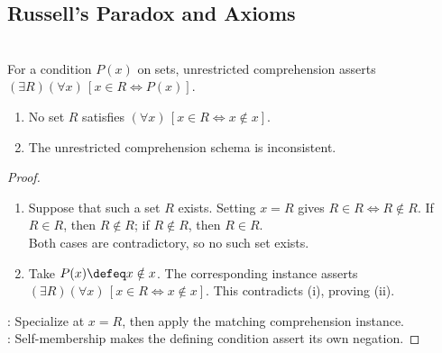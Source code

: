\subsection{Russell's Paradox and Axioms}

\begin{theorem} \label{thm:russells-paradox} \\
For a condition $P(x)$ on sets, unrestricted comprehension asserts $(\exists R)(\forall x)\,[x\in R\Longleftrightarrow P(x)]$.
\begin{enumerate}[label=(\roman*)]
\setlength{\itemsep}{0pt}
\item No set $R$ satisfies $(\forall x)\,[x\in R\Longleftrightarrow x\notin x]$.
\item The unrestricted comprehension schema is inconsistent.
\end{enumerate}
\begin{proof}
\begin{enumerate}[label=(\roman*)]
\setlength{\itemsep}{0pt}
\item Suppose that such a set $R$ exists. Setting $x=R$ gives $R\in R\Longleftrightarrow R\notin R$. If $R\in R$, then $R\notin R$; if $R\notin R$, then $R\in R$.\\
Both cases are contradictory, so no such set exists.
\item Take $P(x)\defeq x\notin x$.
The corresponding instance asserts
$(\exists R)(\forall x)\,[x\in R\Longleftrightarrow x\notin x]$.
This contradicts (i), proving (ii).
\end{enumerate}
: Specialize at $x=R$, then apply the matching comprehension instance.\\
: Self-membership makes the defining condition assert its own negation.
\end{proof}
\end{theorem}

